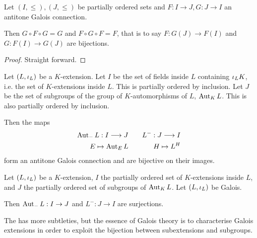 \documentclass[main.tex]{subfiles}
\begin{document}
\begin{thm} 

  Let $(I,\leq), (J,\leq)$ be partially ordered sets and 
  $F : I \to J, G : J \to I$ an antitone Galois connection.

  Then $G \circ F \circ G = G$ and $F \circ G \circ F = F$, 
  that is to say $F : G(J) \to F(I)$ and $G : F(I) \to G(J)$ are bijections. 
\end{thm}
\begin{proof}
  Straight forward. 
\end{proof}

\begin{cor}  
  
  Let $(L,\iota_L)$ be a $K$-extension. 
  Let $I$ be the set of fields inside $L$ containing $\iota_L K$, 
  i.e. the set of $K$-extensions inside $L$. 
  This is partially ordered by inclusion. 
  Let $J$ be the set of subgroups of 
  the group of $K$-automorphisms of $L$, $\operatorname{Aut}_K L$. 
  This is also partially ordered by inclusion. 

  Then the maps \begin{alignat*}{3}
    \operatorname{Aut}_{-} L : I \longrightarrow J &&\quad L^- : J \longrightarrow I \\
    E \mapsto \operatorname{Aut}_E L &&\quad H \mapsto L^H
  \end{alignat*}
  form an antitone Galois connection and are bijective on their images. 
\end{cor}

\begin{thm}  

  Let $(L,\iota_L)$ be a $K$-extension,
  $I$ the partially ordered set of $K$-extensions inside $L$, 
  and $J$ the partially ordered set of subgroups of $\operatorname{Aut}_K L$. 
  Let $(L,\iota_L)$ be Galois. 

  Then $\operatorname{Aut}_{-} L : I \to J$ and $L^{-} : J \to I$ are surjections. 
\end{thm}

\begin{rmk}
  The  has more subtleties, 
  but the essence of Galois theory is to characterise Galois extensions 
  in order to exploit the bijection between subextensions and subgroups. 
\end{rmk}
\end{document}
